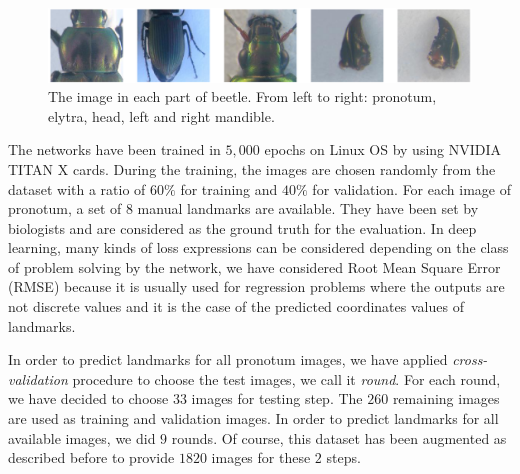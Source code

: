 \documentclass[review]{elsarticle}
\begin{document}
\begin{figure}[h]
	\centering
	\includegraphics[scale=0.25]{images/images5parts}
	\caption{The image in each part of beetle. From left to right: pronotum, elytra, head, left and right mandible.}
	\label{fig5parts}
\end{figure}

The networks have been trained in $5, 000$ epochs on Linux OS by using NVIDIA TITAN X cards. During the training, the images are chosen randomly from the dataset with a ratio of $60\%$ for training and $40\%$ for validation. For each image of pronotum, a set of $8$ manual landmarks are available. They have been set by biologists and are considered as the ground truth for the evaluation. In deep learning, many kinds of loss expressions can be considered depending on the class of problem solving by the network, we have considered Root Mean Square Error (RMSE) because it is usually used for regression problems where the outputs are not discrete values and it is the case of the predicted coordinates values of landmarks.

In order to predict landmarks for all pronotum images, we have applied \textit{cross-validation} procedure to choose the test images, we call it \textit{round}. For each round, we have decided to choose $33$ images for testing step. The $260$ remaining images are used as training and validation images. In order to predict landmarks for all available images, we did $9$ rounds. Of course, this dataset has been augmented as described before to provide $1820$ images for these $2$ steps. 
\end{document}

